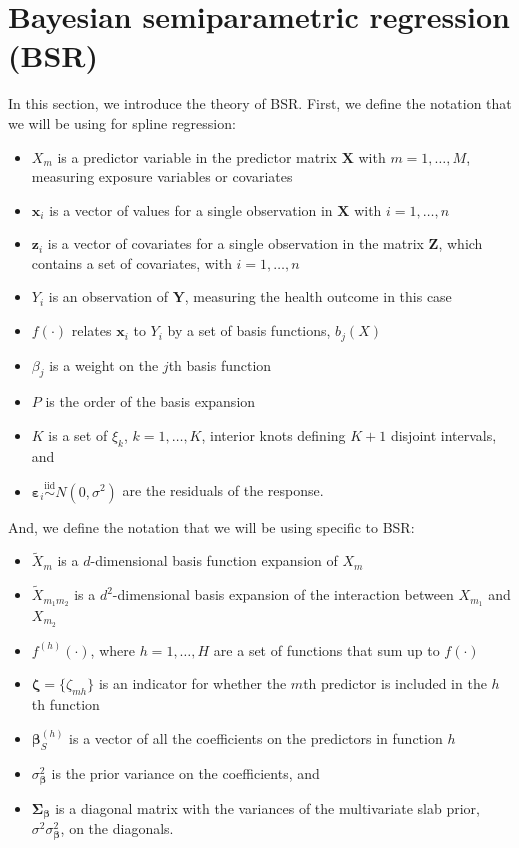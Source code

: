 \documentclass[12pt, twoside]{amherstthesis}
\providecommand{\tightlist}{%
  \setlength{\itemsep}{0pt}\setlength{\parskip}{0pt}}
\begin{document}
\hypertarget{bsr}{%
\section{Bayesian semiparametric regression (BSR)}\label{bsr}}

In this section, we introduce the theory of BSR. First, we define the notation that we will be using for spline regression:
\begin{itemize}
\tightlist
\item
  \(X_m\) is a predictor variable in the predictor matrix \(\textbf{X}\) with \(m=1,\dots,M\), measuring exposure variables or covariates
\item
  \(\textbf{x}_i\) is a vector of values for a single observation in \(\textbf{X}\) with \(i=1,\dots,n\)
\item
  \(\textbf{z}_i\) is a vector of covariates for a single observation in the matrix \(\textbf{Z}\), which contains a set of covariates, with \(i = 1, \dots, n\)
\item
  \(Y_i\) is an observation of \(\textbf{Y}\), measuring the health outcome in this case
\item
  \(f(\cdot)\) relates \(\textbf{x}_i\) to \(Y_i\) by a set of basis functions, \(b_j(X)\)
\item
  \(\beta_j\) is a weight on the \(j\)th basis function
\item
  \(P\) is the order of the basis expansion
\item
  \(K\) is a set of \(\xi_k\), \(k=1,\dots,K\), interior knots defining \(K+1\) disjoint intervals, and
\item
  \(\boldsymbol\varepsilon_i \overset{\textrm{iid}}\sim N(0,\sigma^2)\) are the residuals of the response.
\end{itemize}
And, we define the notation that we will be using specific to BSR:
\begin{itemize}
\tightlist
\item
  \(\widetilde{X}_m\) is a \(d\)-dimensional basis function expansion of \(X_m\)
\item
  \(\widetilde{X}_{m_1m_2}\) is a \(d^2\)-dimensional basis expansion of the interaction between \(X_{m_1}\) and \(X_{m_2}\)
\item
  \(f^{(h)}(\cdot)\), where \(h=1,\dots,H\) are a set of functions that sum up to \(f(\cdot)\)
\item
  \(\boldsymbol\zeta = \{\zeta_{mh}\}\) is an indicator for whether the \(m\)th predictor is included in the \(h\)th function
\item
  \(\boldsymbol\beta_S^{(h)}\) is a vector of all the coefficients on the predictors in function \(h\)
\item
  \(\sigma^2_{\boldsymbol\beta}\) is the prior variance on the coefficients, and
\item
  \(\boldsymbol\Sigma_{\boldsymbol\beta}\) is a diagonal matrix with the variances of the multivariate slab prior, \(\sigma^2\sigma^2_{\boldsymbol\beta}\), on the diagonals.
\end{itemize}
\end{document}
